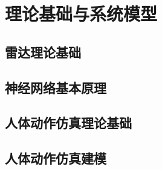 \section{理论基础与系统模型}
\subsection{雷达理论基础}


\subsection{神经网络基本原理}


\subsection{人体动作仿真理论基础}


\subsection{人体动作仿真建模}



